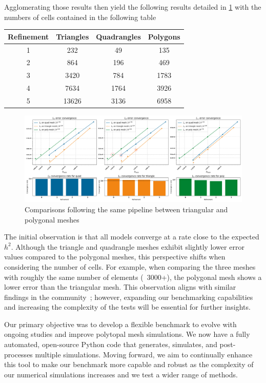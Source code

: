 \documentclass{article}
\begin{document}
Agglomerating those results then yield the following results detailed in \cref{ResultsBench} with the numbers of cells contained in the following table\\
\begin{center}
	\begin{tabular}{||c c c c||}
		\hline
		Refinement & Triangles & Quadrangles & Polygons \\ [0.5ex]
		\hline\hline
		1 & 232 & 49 & 135 \\
		\hline
		2 & 864 & 196 & 469 \\
		\hline
		3 & \color{red}3420 & 784 & 1783 \\
		\hline
		4 & 7634 & 1764 & \color{red}3926 \\
		\hline
		5 & 13626 & \color{red}3136 & 6958 \\ [1ex]
		\hline
	\end{tabular}
\end{center}

\begin{figure}[htbp]
	\centering
	\includegraphics[width=1.0\textwidth]{./Images/ResultsBench.png}
	\caption{\label{ResultsBench} Comparisons following the same pipeline between triangular and polygonal meshes}
\end{figure}
The initial observation is that all models converge at a rate close to the expected $h^2$. Although the triangle and quadrangle meshes exhibit slightly lower error values compared to the polygonal meshes, this perspective shifts when considering the number of cells. For example, when comparing the three meshes with roughly the same number of elements (~3000+), the polygonal mesh shows a lower error than the triangular mesh. This observation aligns with similar findings in the community~\cite{bishop2020polyhedral}; however, expanding our benchmarking capabilities and increasing the complexity of the tests will be essential for further insights.

Our primary objective was to develop a flexible benchmark to evolve with ongoing studies and improve polytopal mesh simulations. We now have a fully automated, open-source Python code that generates, simulates, and post-processes multiple simulations. Moving forward, we aim to continually enhance this tool to make our benchmark more capable and robust as the complexity of our numerical simulations increases and we test a wider range of methods.
\end{document}
